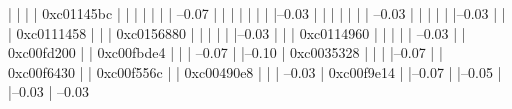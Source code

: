             |          |          |          |                     0xc01145bc
            |          |          |          |          
            |          |          |           --0.07%
            |          |          |                     |          
            |          |          |                     |--0.03%
            |          |          |                     |          
            |          |          |                      --0.03%
            |          |          |          
            |          |          |--0.03%
            |          |          |          0xc0111458
            |          |          |          0xc0156880
            |          |          |          
            |          |          |--0.03%
            |          |          |          0xc0114960
            |          |          |          
            |          |           --0.03%
            |          |                     0xc00fd200
            |          |                     0xc00fbde4
            |          |          
            |           --0.07%
            |          
            |--0.10%
            |          0xc0035328
            |          |          
            |          |--0.07%
            |          |          0xc00f6430
            |          |          0xc00f556c
            |          |          0xc00490e8
            |          |          
            |           --0.03%
            |                     0xc00f9e14
            |          
            |--0.07%
            |          
            |--0.05%
            |          
            |--0.03%
            |          
             --0.03%




